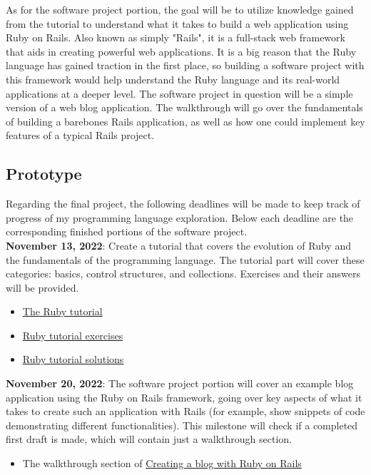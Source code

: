 \documentclass{article}
\theoremstyle{theorem}
\theoremstyle{definition}
\theoremstyle{remark}
\begin{document}
As for the software project portion, the goal will be to utilize knowledge gained from the tutorial to understand what it takes to build a web application using Ruby on Rails. Also known as simply "Rails", it is a full-stack web framework that aids in creating powerful web applications. It is a big reason that the Ruby language has gained traction in the first place, so building a software project with this framework would help understand the Ruby language and its real-world applications at a deeper level. The software project in question will be a simple version of a web blog application. The walkthrough will go over the fundamentals of building a barebones Rails application, as well as how one could implement key features of a typical Rails project.

\subsection{Prototype}
Regarding the final project, the following deadlines will be made to keep track of progress of my programming language exploration. Below each deadline are the corresponding finished portions of the software project.\\

\noindent \textbf{November 13, 2022}: Create a tutorial that covers the evolution of Ruby and the fundamentals of the programming language. The tutorial part will cover these categories: basics, control structures, and collections. Exercises and their answers will be provided.
\begin{itemize}
    \item \href{https://hackmd.io/@evrahnos/HJZPgUjSi}{The Ruby tutorial}
    \item \href{https://hackmd.io/@evrahnos/SkWAtPoBs}{Ruby tutorial exercises}
    \item \href{https://hackmd.io/@evrahnos/S1oUsvoBs}{Ruby tutorial solutions}
\end{itemize}

\noindent \textbf{November 20, 2022}: The software project portion will cover an example blog application using the Ruby on Rails framework, going over key aspects of what it takes to create such an application with Rails (for example, show snippets of code demonstrating different functionalities). This milestone will check if a completed first draft is made, which will contain just a walkthrough section.
\begin{itemize}
    \item The walkthrough section of \href{https://hackmd.io/@evrahnos/ryTuitp8o}{Creating a blog with Ruby on Rails}
\end{itemize}
\end{document}
